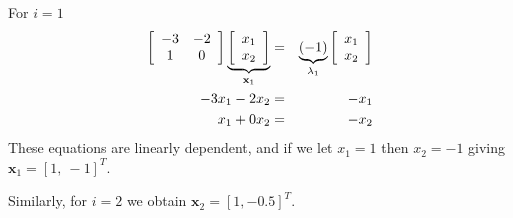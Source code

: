 For $i=1$
\begin{eqnarray*}
 \left[ {\begin{array}{*{20}c}
   { - 3} & { - 2}  \\
   1 & 0  \\
\end{array}} \right]\underbrace {\left[ {\begin{array}{*{20}c}
   {x_1 }  \\
   {x_2 }  \\
\end{array}} \right]}_{{\bf{x}}_1 } & = & \underbrace {( - 1)}_{\lambda _1 }\left[ {\begin{array}{*{20}c}
   {x_1 }  \\
   {x_2 }  \\
\end{array}} \right] \\ 
  - 3x_1  - 2x_2  & = &  - x_1  \\ 
 x_1  + 0x_2  & = &  - x_2  \\ 
 \end{eqnarray*}
These equations are linearly dependent, and if we let $x_1 =1$ then $x_2 = -1$ giving $\mathbf{x}_1=[1,\ -1]^T$.

Similarly, for $i=2$ we obtain $\mathbf{x}_2=[1, -0.5]^T$. 

